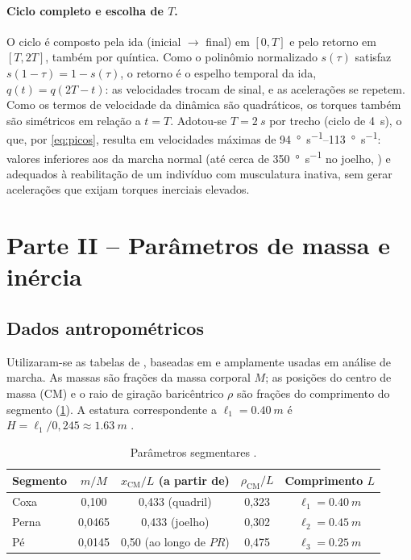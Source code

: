 \documentclass[12pt,a4paper,twoside]{article}
\numberwithin{equation}{section}
\begin{document}
\paragraph{Ciclo completo e escolha de $T$.} O ciclo é composto pela ida (inicial
$\to$ final) em $[0,T]$ e pelo retorno em $[T, 2T]$, também por quíntica. Como o
polinômio normalizado $s(\tau)$ satisfaz $s(1-\tau) = 1 - s(\tau)$, o retorno é o espelho
temporal da ida, $q(t) = q(2T-t)$: as velocidades trocam de sinal, e as acelerações se
repetem. Como os termos de velocidade da dinâmica são quadráticos, os torques também
são simétricos em relação a $t=T$. Adotou-se $T = \SI{2}{s}$ por trecho (ciclo de
\SI{4}{s}), o que, por \eqref{eq:picos}, resulta em velocidades máximas de
\SIrange{94}{113}{\degree\per\s}: valores inferiores aos da marcha normal (até cerca de
\SI{350}{\degree\per\s} no joelho, \cite{winter2009}) e adequados à reabilitação de um
indivíduo com musculatura inativa, sem gerar acelerações que exijam torques inerciais
elevados.

\section{Parte II -- Parâmetros de massa e inércia}\label{cap:parametros}

\subsection{Dados antropométricos}

Utilizaram-se as tabelas de \textcite{winter2009}, baseadas em \textcite{drillis1964}
e amplamente usadas em análise de marcha. As massas são frações da massa corporal $M$;
as posições do centro de massa (CM) e o raio de giração baricêntrico $\rho$ são frações
do comprimento do segmento (\cref{tab:winter}). A estatura correspondente a
$\ell_1 = \SI{0,40}{m}$ é $H = \ell_1/0{,}245 \approx \SI{1,63}{m}$ \cite{drillis1964}.

\begin{table}[htbp]
  \centering
  \caption{Parâmetros segmentares \cite{winter2009}.}
  \label{tab:winter}
  \small
  \begin{tabular}{lcccc}
    \toprule
    Segmento & $m/M$ & $x_{\mathrm{CM}}/L$ (a partir de) & $\rho_{\mathrm{CM}}/L$ & Comprimento $L$ \\
    \midrule
    Coxa  & 0,100  & 0,433 (quadril)   & 0,323 & $\ell_1 = \SI{0,40}{m}$ \\
    Perna & 0,0465 & 0,433 (joelho)    & 0,302 & $\ell_2 = \SI{0,45}{m}$ \\
    Pé    & 0,0145 & 0,50 (ao longo de $PR$) & 0,475 & $\ell_3 = \SI{0,25}{m}$ \\
    \bottomrule
  \end{tabular}
\end{table}
\end{document}
